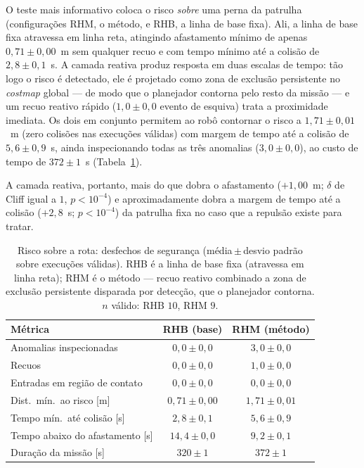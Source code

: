 O teste mais informativo coloca o risco \emph{sobre} uma perna da patrulha
(configurações RHM, o método, e RHB, a linha de base fixa). Ali, a linha de base fixa
atravessa em linha reta, atingindo afastamento mínimo de apenas $0{,}71\pm0{,}00$~m
sem qualquer recuo e com tempo mínimo até a colisão de $2{,}8\pm0{,}1$~s. A camada
reativa produz resposta em duas escalas de tempo: tão logo o risco é detectado, ele é
projetado como zona de exclusão persistente no \textit{costmap} global --- de modo
que o planejador contorna pelo resto da missão --- e um recuo reativo rápido
($1{,}0\pm0{,}0$ evento de esquiva) trata a proximidade imediata. Os dois em conjunto
permitem ao robô contornar o risco a $1{,}71\pm0{,}01$~m (zero colisões nas execuções
válidas) com margem de tempo até a colisão de $5{,}6\pm0{,}9$~s, ainda inspecionando
todas as três anomalias ($3{,}0\pm0{,}0$), ao custo de tempo de $372\pm1$~s
(Tabela~\ref{tab:res-seguranca}).

A camada reativa, portanto, mais do que dobra o afastamento ($+1{,}00$~m; $\delta$ de
Cliff igual a $1$, $p<10^{-4}$) e aproximadamente dobra a margem de tempo até a
colisão ($+2{,}8$~s; $p<10^{-4}$) da patrulha fixa no caso que a repulsão existe para
tratar.

\begin{table}[htb]
\centering
\caption{Risco sobre a rota: desfechos de segurança (média\,$\pm$\,desvio padrão
sobre execuções válidas). RHB é a linha de base fixa (atravessa em linha reta); RHM é
o método --- recuo reativo combinado a zona de exclusão persistente disparada por
detecção, que o planejador contorna. $n$ válido: RHB $10$, RHM $9$.}
\label{tab:res-seguranca}
\footnotesize
\begin{tabular}{lcc}
\hline
\textbf{Métrica} & \textbf{RHB (base)} & \textbf{RHM (método)}\\
\hline
Anomalias inspecionadas        & $0{,}0\pm0{,}0$   & $3{,}0\pm0{,}0$\\
Recuos                         & $0{,}0\pm0{,}0$   & $1{,}0\pm0{,}0$\\
Entradas em região de contato  & $0{,}0\pm0{,}0$   & $0{,}0\pm0{,}0$\\
Dist.\ mín.\ ao risco [m]      & $0{,}71\pm0{,}00$ & $1{,}71\pm0{,}01$\\
Tempo mín.\ até colisão [s]    & $2{,}8\pm0{,}1$   & $5{,}6\pm0{,}9$\\
Tempo abaixo do afastamento [s]& $14{,}4\pm0{,}0$  & $9{,}2\pm0{,}1$\\
Duração da missão [s]          & $320\pm1$         & $372\pm1$\\
\hline
\end{tabular}
\end{table}

